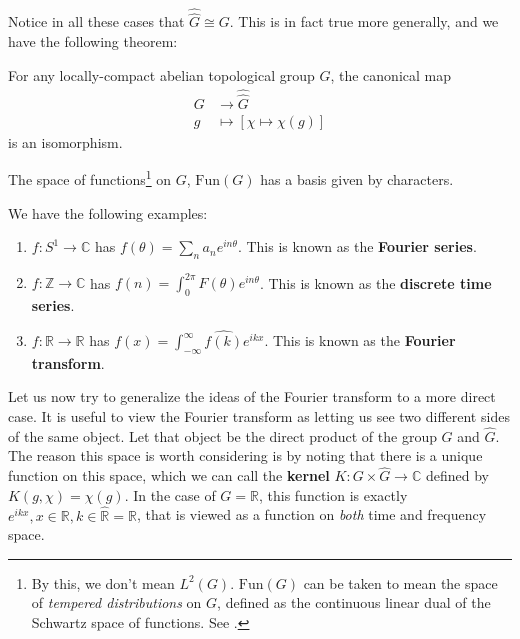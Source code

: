 Notice in all these cases that $\widehat{\widehat G} \cong G$. This is in fact true more generally, and we have the following theorem:
\begin{theorem}
For any locally-compact abelian topological group $G$, the canonical map 
\begin{equation*}
\begin{split}
G &\to \widehat{\widehat G}\\
g &\mapsto [\chi \mapsto \chi (g)]
\end{split}
\end{equation*}
is an isomorphism.
\end{theorem}

\begin{obs}
	The space of functions\footnote{By this, we don't mean $L^2(G)$. $\mathrm{Fun}(G)$ can be taken to mean the space of \emph{tempered distributions} on $G$, defined as the continuous linear dual of the Schwartz space of functions. See \cite{arthur1989}.} on $G$, $\mathrm{Fun}(G)$ has a basis given by characters. 
\end{obs}
\begin{eg}
	We have the following examples:
	\begin{enumerate}
		\item $f: S^1 \to \mathbb C$ has $f(\theta) = \sum_{n} a_n e^{i n \theta}$. This is known as the \textbf{Fourier series}.
		\item $f: \mathbb Z \to \mathbb C$ has $f(n) = \int_{0}^{2\pi} F(\theta) e^{i n \theta}$. This is known as the \textbf{discrete time series}.
		\item $f: \mathbb R \to \mathbb R$ has $f(x) = \int_{-\infty}^\infty \widehat{f(k)} e^{ikx}$. This is known as the \textbf{Fourier transform}.
	\end{enumerate}
\end{eg}

Let us now try to generalize the ideas of the Fourier transform to a more direct case. It is useful to view the Fourier transform as letting us see two different sides of the same object. Let that object be the direct product of the group $G$ and $\hat G$. 
The reason this space is worth considering is by noting that there is a unique function on this space, which we can call the \textbf{kernel} $K: G \times \hat G \to \mathbb C$ defined by $K(g, \chi) = \chi (g)$. In the case of  $G=\mathbb R$, this function is exactly $e^{i k x}, x \in \mathbb R, k \in \widehat{ \mathbb R} = \mathbb R$, that is viewed as a function on \emph{both} time and frequency space.

